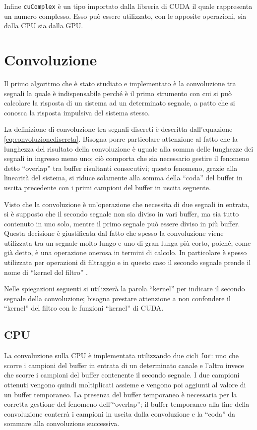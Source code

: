 Infine \lstinline{cuComplex} è un tipo importato dalla libreria di CUDA il quale rappresenta un numero complesso. Esso può essere utilizzato, con le apposite operazioni, sia dalla CPU sia dalla GPU.

\section{Convoluzione}
Il primo algoritmo che è stato studiato e implementato è la convoluzione tra segnali la quale è indispensabile perché è il primo strumento con cui si può calcolare la risposta di un sistema ad un determinato segnale, a patto che si conosca la risposta impulsiva del sistema stesso.

La definizione di convoluzione tra segnali discreti è descritta dall'equazione \ref{eq:convoluzionediscreta}. Bisogna porre particolare attenzione al fatto che la lunghezza del risultato della convoluzione è uguale alla somma delle lunghezze dei segnali in ingresso meno uno; ciò comporta che sia necessario gestire il fenomeno detto ``overlap'' tra buffer risultanti consecutivi; questo fenomeno, grazie alla linearità del sistema, si riduce solamente alla somma della ``coda'' del buffer in uscita precedente con i primi campioni del buffer in uscita seguente.

Visto che la convoluzione è un'operazione che necessita di due segnali in entrata, si è supposto che il secondo segnale non sia diviso in vari buffer, ma sia tutto contenuto in uno solo, mentre il primo segnale può essere diviso in più buffer. Questa decisione è giustificata dal fatto che spesso la convoluzione viene utilizzata tra un segnale molto lungo e uno di gran lunga più corto, poiché, come già detto, è una operazione onerosa in termini di calcolo. In particolare è spesso utilizzata per operazioni di filtraggio e in questo caso il secondo segnale prende il nome di ``kernel del filtro'' \cite[p.~108]{dspguide}.

Nelle spiegazioni seguenti si utilizzerà la parola ``kernel'' per indicare il secondo segnale della convoluzione; bisogna prestare attenzione a non confondere il ``kernel'' del filtro con le funzioni ``kernel'' di CUDA.

\subsection{CPU}

La convoluzione sulla CPU è implementata utilizzando due cicli \lstinline{for}: uno che scorre i campioni del buffer in entrata di un determinato canale e l'altro invece che scorre i campioni del buffer contenente il secondo segnale. I due campioni ottenuti vengono quindi moltiplicati assieme e vengono poi aggiunti al valore di un buffer temporaneo. La presenza del buffer temporaneo è necessaria per la corretta gestione del fenomeno dell'``overlap''; il buffer temporaneo alla fine della convoluzione conterrà i campioni in uscita dalla convoluzione e la ``coda'' da sommare alla convoluzione successiva.


